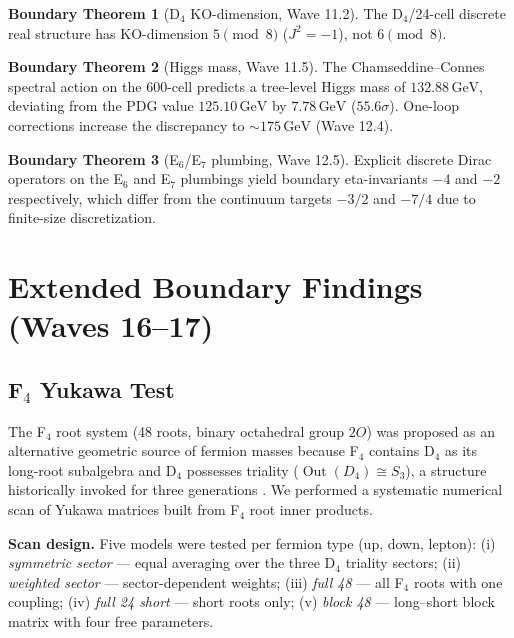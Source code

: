 \documentclass[11pt,a4paper]{article}
\theoremstyle{definition}
\newtheorem{boundary}{Boundary Theorem}
\begin{document}
\begin{boundary}[D$_4$ KO-dimension, Wave 11.2]\label{boundary:d4}
  The D$_4$/24-cell discrete real structure has KO-dimension
  $5 \pmod 8$ ($J^2 = -1$), not $6 \pmod 8$.
\end{boundary}

\begin{boundary}[Higgs mass, Wave 11.5]\label{boundary:higgs}
  The Chamseddine--Connes spectral action on the 600-cell predicts a
  tree-level Higgs mass of $132.88\,\text{GeV}$, deviating from the PDG
  value $125.10\,\text{GeV}$ by $7.78\,\text{GeV}$ ($55.6\sigma$).
  One-loop corrections increase the discrepancy to $\sim 175\,\text{GeV}$
  (Wave 12.4).
\end{boundary}

\begin{boundary}[E$_6$/E$_7$ plumbing, Wave 12.5]\label{boundary:e6e7}
  Explicit discrete Dirac operators on the E$_6$ and E$_7$ plumbings yield
  boundary eta-invariants $-4$ and $-2$ respectively, which differ from the
  continuum targets $-3/2$ and $-7/4$ due to finite-size discretization.
\end{boundary}

\section{Extended Boundary Findings (Waves 16--17)}\label{sec:extended}

\subsection{F$_4$ Yukawa Test}\label{sec:f4yukawa}

The F$_4$ root system (48 roots, binary octahedral group $2O$) was proposed
as an alternative geometric source of fermion masses because F$_4$ contains
D$_4$ as its long-root subalgebra and D$_4$ possesses triality
($\operatorname{Out}(D_4) \cong S_3$), a structure historically invoked for
three generations \cite{Ramond:2001,Gursey:1975}. We performed a systematic
numerical scan of Yukawa matrices built from F$_4$ root inner products.

\textbf{Scan design.} Five models were tested per fermion type (up, down,
lepton): (i) \textit{symmetric sector} --- equal averaging over the three
D$_4$ triality sectors; (ii) \textit{weighted sector} --- sector-dependent
weights; (iii) \textit{full 48} --- all F$_4$ roots with one coupling; (iv)
\textit{full 24 short} --- short roots only; (v) \textit{block 48} ---
long--short block matrix with four free parameters.
\end{document}
